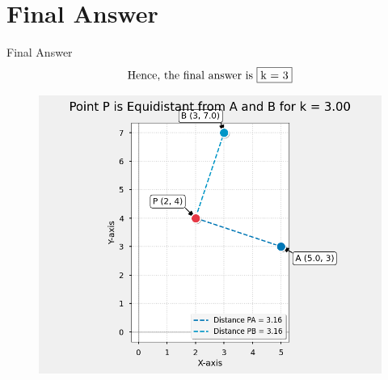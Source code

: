\documentclass{beamer}
\theoremstyle{remark}
\begin{document}
\section{Final Answer}
\begin{frame}{Final Answer}
\begin{align*}
    \text{Hence, the final answer is }\fbox{k = 3} 
\end{align*}
\begin{figure}
    \centering
    \includegraphics[width=0.6\columnwidth]{figs/1.png}
\end{figure}
\end{frame}
\end{document}

